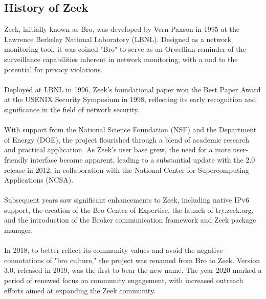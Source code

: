 \subsection{History of Zeek}

Zeek, initially known as Bro, was developed by Vern Paxson in 1995 at the Lawrence Berkeley National Laboratory (LBNL). Designed as a network monitoring tool, it was coined "Bro" to serve as an Orwellian reminder of the surveillance capabilities inherent in network monitoring, with a nod to the potential for privacy violations.
\\\\
Deployed at LBNL in 1996, Zeek's foundational paper won the Best Paper Award at the USENIX Security Symposium in 1998, reflecting its early recognition and significance in the field of network security.
\\\\
With support from the National Science Foundation (NSF) and the Department of Energy (DOE), the project flourished through a blend of academic research and practical application. As Zeek's user base grew, the need for a more user-friendly interface became apparent, leading to a substantial update with the 2.0 release in 2012, in collaboration with the National Center for Supercomputing Applications (NCSA).
\\\\
Subsequent years saw significant enhancements to Zeek, including native IPv6 support, the creation of the Bro Center of Expertise, the launch of try.zeek.org, and the introduction of the Broker communication framework and Zeek package manager.
\\\\
In 2018, to better reflect its community values and avoid the negative connotations of "bro culture," the project was renamed from Bro to Zeek. Version 3.0, released in 2019, was the first to bear the new name. The year 2020 marked a period of renewed focus on community engagement, with increased outreach efforts aimed at expanding the Zeek community.